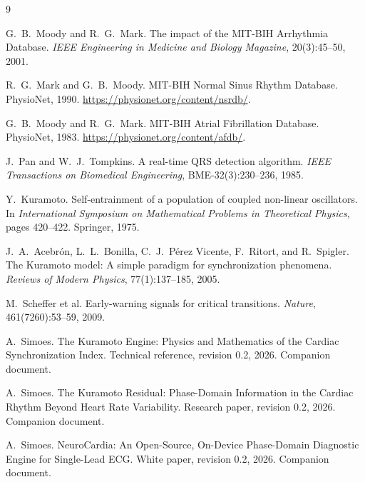 \documentclass[11pt]{article}
\begin{document}
\begin{thebibliography}{9}

G.~B.~Moody and R.~G.~Mark. The impact of the MIT-BIH Arrhythmia
Database. \emph{IEEE Engineering in Medicine and Biology Magazine},
20(3):45--50, 2001.

R.~G.~Mark and G.~B.~Moody. MIT-BIH Normal Sinus Rhythm Database.
PhysioNet, 1990. \url{https://physionet.org/content/nsrdb/}.

G.~B.~Moody and R.~G.~Mark. MIT-BIH Atrial Fibrillation Database.
PhysioNet, 1983. \url{https://physionet.org/content/afdb/}.

J.~Pan and W.~J.~Tompkins. A real-time QRS detection algorithm.
\emph{IEEE Transactions on Biomedical Engineering},
BME-32(3):230--236, 1985.

Y.~Kuramoto. Self-entrainment of a population of coupled non-linear
oscillators. In \emph{International Symposium on Mathematical Problems
in Theoretical Physics}, pages 420--422. Springer, 1975.

J.~A.~Acebr\'on, L.~L.~Bonilla, C.~J.~P\'erez Vicente, F.~Ritort, and
R.~Spigler. The Kuramoto model: A simple paradigm for synchronization
phenomena. \emph{Reviews of Modern Physics}, 77(1):137--185, 2005.

M.~Scheffer et al. Early-warning signals for critical transitions.
\emph{Nature}, 461(7260):53--59, 2009.

A.~Simoes. The Kuramoto Engine: Physics and Mathematics of the Cardiac
Synchronization Index. Technical reference, revision 0.2, 2026.
Companion document.

A.~Simoes. The Kuramoto Residual: Phase-Domain Information in the
Cardiac Rhythm Beyond Heart Rate Variability. Research paper, revision
0.2, 2026. Companion document.

A.~Simoes. NeuroCardia: An Open-Source, On-Device Phase-Domain
Diagnostic Engine for Single-Lead ECG. White paper, revision 0.2,
2026. Companion document.

\end{thebibliography}
\end{document}
